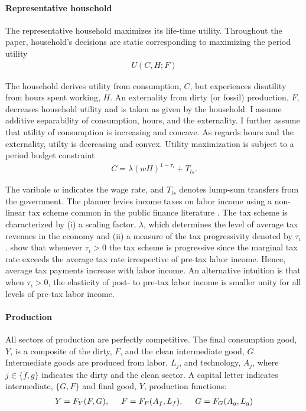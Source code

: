 \paragraph{Representative household}
The representative household maximizes its life-time utility. Throughout the paper, household's decisions are static corresponding to maximizing the period utility
\begin{align}
U(C,H; F)
\end{align} 

The household derives utility from consumption, $C$, but experiences disutility from hours spent working, $H$. An externality from dirty (or fossil) production, $F$, decreases household utility and is taken as given by the household.
I assume additive separability of consumption, hours, and the externality. I further assume that utility of consumption is increasing and concave. As regards hours and the externality, utilty is decreasing and convex.
Utility maximization is subject to a period budget constraint
\begin{align}
	 C= \lambda(wH)^{1-\tau_{\iota}}+T_{ls}. \label{eq:hhbudget}
\end{align}

The varibale $w$ indicates the wage rate, and $T_{ls}$ denotes lump-sum transfers from the government.
The planner levies income taxes on labor income using a non-linear tax scheme common in the public finance literature \citep{Heathcote2017OptimalFramework, Benabou2002TaxEfficiency}. The tax scheme is
characterized by (i) a scaling factor, $\lambda$, which determines the level of average tax revenues in the economy and (ii) a measure of the tax progressivity denoted by $\tau_{\iota}$. 
\cite{Heathcote2017OptimalFramework} show that whenever $\tau_{\iota}>0$ the tax scheme is progressive since the marginal tax rate exceeds the average tax rate irrespective of  pre-tax labor income. Hence, average tax payments increase with labor income. An alternative intuition is that when $\tau_{\iota}>0$, the elasticity of post- to pre-tax labor income is smaller unity for all levels of pre-tax labor income.  %

\paragraph{Production}
All sectors of production are perfectly competitive. The final consumption good, $Y$, is a composite of the dirty, $F$, and the clean intermediate good, $G$. 
Intermediate goods are produced from labor, $L_j$, and technology, $A_j$, where $j\in \{f,g\}$ indicates the dirty and the clean sector. A capital letter indicates intermediate, $\{G,F\}$ and final good, $Y$, production functions: 
\begin{align}
Y=F_Y(F, G), \hspace{5mm} F=F_F(A_f, L_f),\hspace{5mm} G=F_G(A_g, L_g) \label{eq:prod}
\end{align}


